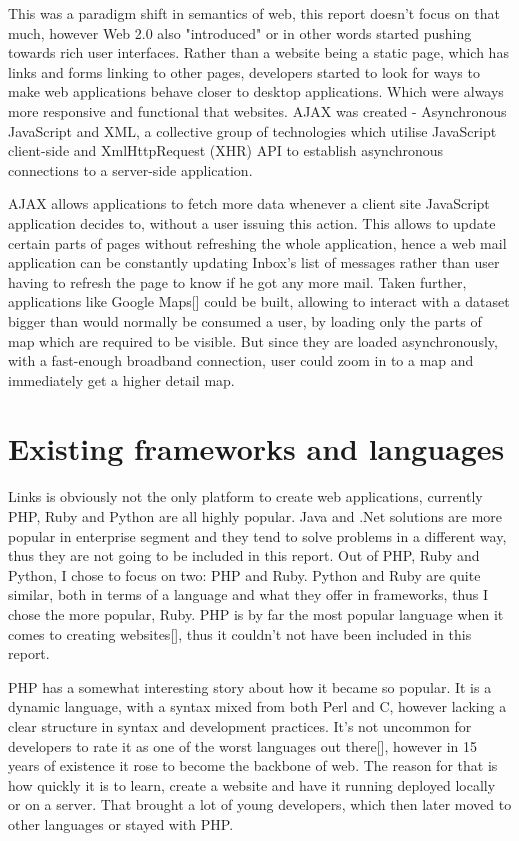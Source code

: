 This was a paradigm shift in semantics of web, this report doesn't focus on that much, however Web 2.0 also "introduced" or in other words started pushing towards rich user interfaces. Rather than a website being a static page, which has links and forms linking to other pages, developers started to look for ways to make web applications behave closer to desktop applications. Which were always more responsive and functional that websites. AJAX was created - Asynchronous JavaScript and XML, a collective group of technologies which utilise JavaScript client-side and XmlHttpRequest (XHR) API to establish asynchronous connections to a server-side application. 

AJAX allows applications to fetch more data whenever a client site JavaScript application decides to, without a user issuing this action. This allows to update certain parts of pages without refreshing the whole application, hence a web mail application can be constantly updating Inbox's list of messages rather than user having to refresh the page to know if he got any more mail. Taken further, applications like Google Maps[] could be built, allowing to interact with a dataset bigger than would normally be consumed a user, by loading only the parts of map which are required to be visible. But since they are loaded asynchronously, with a fast-enough broadband connection, user could zoom in to a map and immediately get a higher detail map.

\section{Existing frameworks and languages}

Links is obviously not the only platform to create web applications, currently PHP, Ruby and Python are all highly popular. Java and .Net solutions are more popular in enterprise segment and they tend to solve problems in a different way, thus they are not going to be included in this report. Out of PHP, Ruby and Python, I chose to focus on two: PHP and Ruby. Python and Ruby are quite similar, both in terms of a language and what they offer in frameworks, thus I chose the more popular, Ruby. PHP is by far the most popular language when it comes to creating websites[], thus it couldn't not have been included in this report. 

PHP has a somewhat interesting story about how it became so popular. It is a dynamic language, with a syntax mixed from both Perl and C, however lacking a clear structure in syntax and development practices. It's not uncommon for developers to rate it as one of the worst languages out there[], however in 15 years of existence it rose to become the backbone of web. The reason for that is how quickly it is to learn, create a website and have it running deployed locally or on a server. That brought a lot of young developers, which then later moved to other languages or stayed with PHP. 

